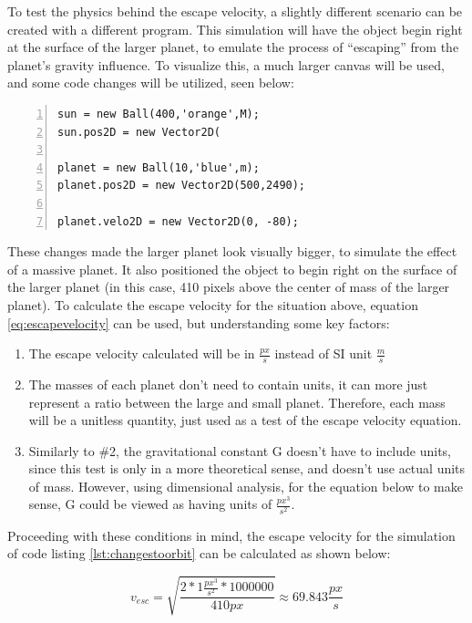 To test the physics behind the escape velocity, a slightly different scenario can be created with a different program.  This simulation will have the object begin right at the surface of the larger planet, to emulate the process of ``escaping'' from the planet's gravity influence.  To visualize this, a much larger canvas will be used, and some code changes will be utilized, seen below:


\begin{lstlisting}[breaklines=true, frame=single, numbers=left, caption=New conditions for escape velocity simulation, label=lst:changestoorbit]
sun = new Ball(400,'orange',M);
sun.pos2D = new Vector2D(

planet = new Ball(10,'blue',m);
planet.pos2D = new Vector2D(500,2490);

planet.velo2D = new Vector2D(0, -80);
\end{lstlisting}

These changes made the larger planet look visually bigger, to simulate the effect of a massive planet.  It also positioned the object to begin right on the surface of the larger planet (in this case, 410 pixels above the center of mass of the larger planet).  To calculate the escape velocity for the situation above, equation \ref{eq:escapevelocity} can be used, but understanding some key factors:

\begin{enumerate}
\item The escape velocity calculated will be in $\frac{px}{s}$ instead of SI unit $\frac{m}{s}$
\item The masses of each planet don't need to contain units, it can more just represent a ratio between the large and small planet.  Therefore, each mass will be a unitless quantity, just used as a test of the escape velocity equation.
\item Similarly to  \#2, the gravitational constant G doesn't have to include units, since this test is only in a more theoretical sense, and doesn't use actual units of mass.  However, using dimensional analysis, for the equation below to make sense, G could be viewed as having units of $\frac{px^3}{s^2}$.
\end{enumerate}

Proceeding with these conditions in mind, the escape velocity for the simulation of code listing \ref{lst:changestoorbit}
can be calculated as shown below:

\begin{equation}\label{eq:calcvescape}
 v_{esc} = \sqrt{\frac{2*1 \frac{px^3}{s^2}*1000000}{410 px}} \approx 69.843 \frac{px}{s} 
\end{equation}


